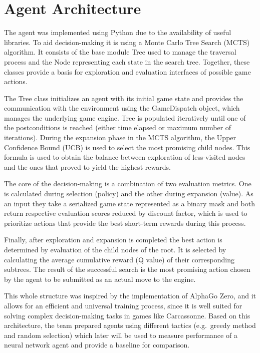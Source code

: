 \section{Agent Architecture}

The agent was implemented using Python due to the availability of useful libraries. 
To aid decision-making it is using a Monte Carlo Tree Search (MCTS) algorithm. 
It consists of the base module Tree used to manage the traversal process and 
the Node representing each state in the search tree. Together, these classes 
provide a basis for exploration and evaluation interfaces of possible game actions.

The Tree class initializes an agent with its initial game state and provides the 
communication with the environment using the GameDispatch object, which manages 
the underlying game engine. Tree is populated iteratively until one of the 
postconditions is reached (either time elapsed or maximum number of iterations). 
During the expansion phase in the MCTS algorithm, the Upper Confidence Bound (UCB) 
is used to select the most promising child nodes. This formula is used to obtain 
the balance between exploration of less-visited nodes and the ones that proved to
yield the highest rewards.

The core of the decision-making is a combination of two evaluation metrics. 
One is calculated during selection (policy) and the other during expansion (value). 
As an input they take a serialized game state represented as a binary mask and both 
return respective evaluation scores reduced by discount factor, which is used to 
prioritize actions that provide the best short-term rewards during this process.

Finally, after exploration and expansion is completed the best action is determined 
by evaluation of the child nodes of the root. It is selected by calculating the 
average cumulative reward (Q value) of their corresponding subtrees. 
The result of the successful search is the most promising action chosen by 
the agent to be submitted as an actual move to the engine. 

This whole structure was inspired by the implementation of AlphaGo Zero, 
and it allows for an efficient and universal training process, since 
it is well suited for solving complex decision-making tasks in games like Carcassonne. 
Based on this architecture, the team prepared agents using different 
tactics (e.g.\ greedy method and random selection) which later will be used to 
measure performance of a neural network agent and provide a baseline for comparison.

